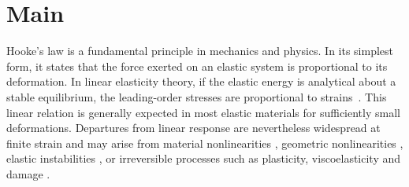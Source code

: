 \documentclass[pdflatex, twocolumn, sn-nature]{sn-jnl}
\begin{document}
\section*{Main}


Hooke’s law is a fundamental principle in mechanics and physics. In its simplest form, it states that the force exerted on an elastic system is proportional to its deformation. In linear elasticity theory, if the elastic energy is analytical about a stable equilibrium, the leading-order stresses are proportional to strains~\cite{LandauLifshitzElasticity}. This linear relation is generally expected in most elastic materials for sufficiently small deformations.
Departures from linear response are nevertheless widespread at finite strain and may arise from material nonlinearities \cite{ogden1997non}, geometric nonlinearities \cite{AudolyPomeau}, elastic instabilities \cite{cerda2003geometry}, or irreversible processes such as plasticity, viscoelasticity and damage \cite{fung2013biomechanics}.

\end{document}
